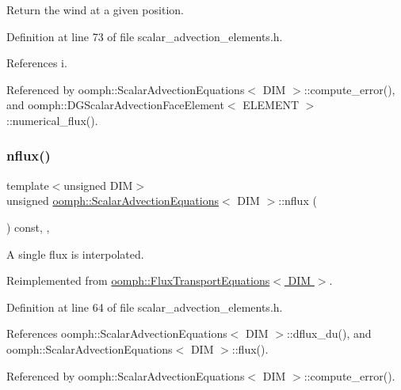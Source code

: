 Return the wind at a given position. 



Definition at line 73 of file scalar\+\_\+advection\+\_\+elements.\+h.



References i.



Referenced by oomph\+::\+Scalar\+Advection\+Equations$<$ D\+I\+M $>$\+::compute\+\_\+error(), and oomph\+::\+D\+G\+Scalar\+Advection\+Face\+Element$<$ E\+L\+E\+M\+E\+N\+T $>$\+::numerical\+\_\+flux().

\mbox{\label{classoomph_1_1ScalarAdvectionEquations_adb45110daf7b47f7a2091448765b6f06}} 
\subsubsection{\texorpdfstring{nflux()}{nflux()}}
{\footnotesize\ttfamily template$<$unsigned D\+IM$>$ \\
unsigned \hyperlink{classoomph_1_1ScalarAdvectionEquations}{oomph\+::\+Scalar\+Advection\+Equations}$<$ D\+IM $>$\+::nflux (\begin{DoxyParamCaption}{ }\end{DoxyParamCaption}) const\hspace{0.3cm}{\ttfamily [inline]}, {\ttfamily [protected]}, {\ttfamily [virtual]}}



A single flux is interpolated. 



Reimplemented from \hyperlink{classoomph_1_1FluxTransportEquations_ae77531d3bdd9241f450fdb360e7a5cc9}{oomph\+::\+Flux\+Transport\+Equations$<$ D\+I\+M $>$}.



Definition at line 64 of file scalar\+\_\+advection\+\_\+elements.\+h.



References oomph\+::\+Scalar\+Advection\+Equations$<$ D\+I\+M $>$\+::dflux\+\_\+du(), and oomph\+::\+Scalar\+Advection\+Equations$<$ D\+I\+M $>$\+::flux().



Referenced by oomph\+::\+Scalar\+Advection\+Equations$<$ D\+I\+M $>$\+::compute\+\_\+error().

